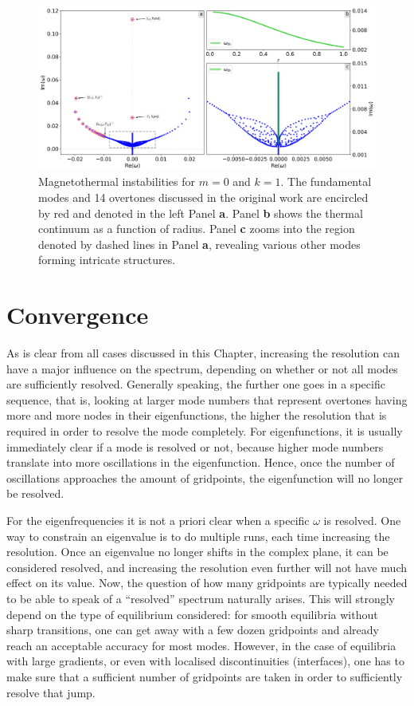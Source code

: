 \begin{figure}[t]
  \centering
  \includegraphics[width=\textwidth]{magnetothermal.png}
  \caption{
    Magnetothermal instabilities for $m = 0$ and $k = 1$. The fundamental modes and 14 overtones discussed in the original work are encircled by red and denoted in the left Panel \textbf{a}. Panel \textbf{b} shows the thermal continuum as a function of radius. Panel \textbf{c} zooms into the region denoted by dashed lines in Panel \textbf{a}, revealing various other modes forming intricate structures.
  }
  \label{fig: magnetothermal}
\end{figure}

\section{Convergence} \label{sec: convergence}
As is clear from all cases discussed in this Chapter, increasing the resolution can have a major influence on the spectrum, depending on whether or not all modes are sufficiently resolved. Generally speaking, the further one goes in a specific sequence, that is, looking at larger mode numbers that represent overtones having more and more nodes in their eigenfunctions, the higher the resolution that is required in order to resolve the mode completely. For eigenfunctions, it is usually immediately clear if a mode is resolved or not, because higher mode numbers translate into more oscillations in the eigenfunction. Hence, once the number of oscillations approaches the amount of gridpoints, the eigenfunction will no longer be resolved.

For the eigenfrequencies it is not a priori clear when a specific $\omega$ is resolved. One way to constrain an eigenvalue is to do multiple runs, each time increasing the resolution. Once an eigenvalue no longer shifts in the complex plane, it can be considered resolved, and increasing the resolution even further will not have much effect on its value. Now, the question of how many gridpoints are typically needed to be able to speak of a ``resolved'' spectrum naturally arises. This will strongly depend on the type of equilibrium considered: for smooth equilibria without sharp transitions, one can get away with a few dozen gridpoints and already reach an acceptable accuracy for most modes. However, in the case of equilibria with large gradients, or even with localised discontinuities (interfaces), one has to make sure that a sufficient number of gridpoints are taken in order to sufficiently resolve that jump.

